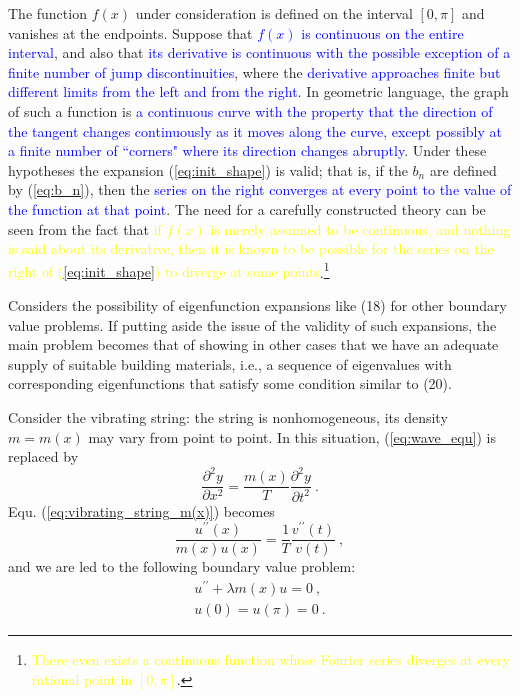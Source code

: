 \documentclass[12pt,a4paper]{article}
\newcounter{theo}[section]\setcounter{theo}{0}
\begin{document}
The function $f(x)$ under consideration is defined on the interval $[0,\pi]$ and vanishes at the endpoints. Suppose that \textcolor{blue}{$f(x)$ is continuous on the entire interval}, and also that \textcolor{blue}{its derivative is continuous with the possible exception of a finite number of jump discontinuities}, where the \textcolor{blue}{derivative approaches finite but different limits from the left and from the right}. In geometric language, the graph of such a function is \textcolor{blue}{a continuous curve with the property that the direction of the tangent changes continuously as it moves along the curve, except possibly at a finite number of ``corners" where its direction changes abruptly}. Under these hypotheses the expansion (\ref{eq:init_shape}) is valid; that is, if the $b_n$ are defined by (\ref{eq:b_n}), then the \textcolor{blue}{series on the right converges at every point to the value of the function at that point}. The need for a carefully constructed theory can be seen from the fact that \textcolor{yellow}{if $f(x)$ is merely assumed to be continuous, and nothing is said about its derivative, then it is known to be possible for the series on the right of (\ref{eq:init_shape}) to diverge at some points}.\footnote{\textcolor{yellow}{There even exists a continuous function whose Fourier series diverges at every rational point in $[0,\pi]$}.}

Considers the possibility of eigenfunction expansions like (18) for other boundary value problems. If putting aside the
issue of the validity of such expansions, the main problem becomes that of showing in other cases that we have an adequate supply of suitable building materials, i.e., a sequence of eigenvalues with corresponding eigenfunctions that satisfy some condition similar to (20).

Consider the vibrating string: the string is nonhomogeneous, its density $m = m(x)$ may vary from point to point. In this situation, (\ref{eq:wave_equ}) is replaced by
\begin{equation}
\dfrac{\partial^2 y}{\partial x^2} = \dfrac{m(x)}{T} \dfrac{\partial^2 y}{\partial t^2} ~.
\label{eq:vibrating_string_m(x)}
\end{equation}
Equ. (\ref{eq:vibrating_string_m(x)}) becomes 
\begin{equation*}
\dfrac{u^{\prime \prime}(x) }{m(x) u(x)} = \dfrac{1}{T} \dfrac{v^{\prime \prime}(t)}{v(t)} ~,
\end{equation*}
and we are led to the following boundary value problem:
\begin{align}
u^{\prime \prime} +\lambda m(x) u =0 ~, \\
u(0) = u(\pi) = 0 ~.
\end{align}
\end{document}
